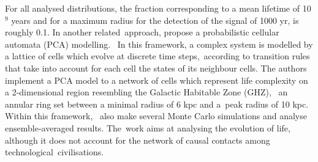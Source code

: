 \documentclass[crop]{CSLB}
\begin{document}
%
For all analysed distributions, the fraction corresponding to a mean
lifetime of 10$^9$ years and for a maximum radius for the detection of
the signal of 1000 yr, is roughly 0.1.
%
In another related approach, \citet{vukotic_astrobiological_2012}
propose a probabilistic cellular automata (PCA) modelling. 
%
In this framework, a complex system is modelled by a lattice of cells
which evolve at discrete time steps, according to transition rules
that take into account for each cell the states of its neighbour
cells.
%
The authors implement a PCA model to a network of cells which
represent life complexity on a 2-dimensional region resembling the
Galactic Habitable Zone (GHZ),  an annular ring set between a minimal
radius of 6 kpc and a peak radius of 10 kpc. 
%
Within this framework, \citet{vukotic_astrobiological_2012} also make
several Monte Carlo simulations and analyse ensemble-averaged results.
%
The work aims at analysing the evolution of life, although it does not
account for the network of causal contacts among
technological civilisations.
\end{document}
